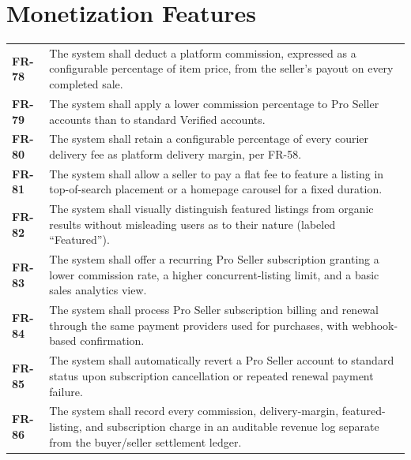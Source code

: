 \documentclass[11pt,a4paper]{report}
\newenvironment{reqtable}{\begin{longtable}{p{2.2cm}p{11.5cm}}}{\end{longtable}}
\begin{document}
\section{Monetization Features}
\begin{reqtable}
\textbf{FR-78} & The system shall deduct a platform commission, expressed as a configurable percentage of item price, from the seller's payout on every completed sale. \\
\textbf{FR-79} & The system shall apply a lower commission percentage to Pro Seller accounts than to standard Verified accounts. \\
\textbf{FR-80} & The system shall retain a configurable percentage of every courier delivery fee as platform delivery margin, per FR-58. \\
\textbf{FR-81} & The system shall allow a seller to pay a flat fee to feature a listing in top-of-search placement or a homepage carousel for a fixed duration. \\
\textbf{FR-82} & The system shall visually distinguish featured listings from organic results without misleading users as to their nature (labeled ``Featured''). \\
\textbf{FR-83} & The system shall offer a recurring Pro Seller subscription granting a lower commission rate, a higher concurrent-listing limit, and a basic sales analytics view. \\
\textbf{FR-84} & The system shall process Pro Seller subscription billing and renewal through the same payment providers used for purchases, with webhook-based confirmation. \\
\textbf{FR-85} & The system shall automatically revert a Pro Seller account to standard status upon subscription cancellation or repeated renewal payment failure. \\
\textbf{FR-86} & The system shall record every commission, delivery-margin, featured-listing, and subscription charge in an auditable revenue log separate from the buyer/seller settlement ledger. \\
\end{reqtable}
\end{document}

